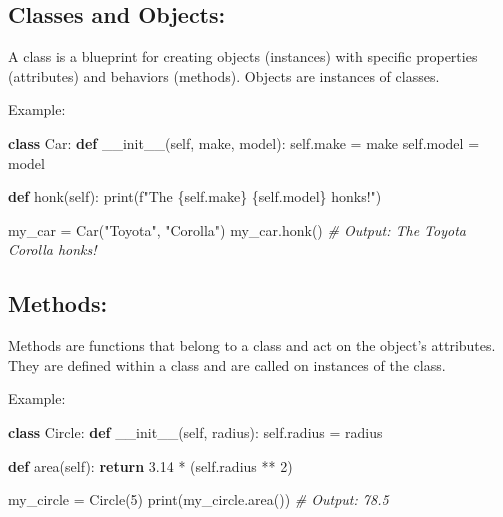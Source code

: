 \documentclass[
  paper=a4,
  ,captions=tableheading
]{scrartcl}
\newenvironment{Shaded}{}{}
\newcommand{\BuiltInTok}[1]{\textcolor[rgb]{0.00,0.50,0.00}{#1}}
\newcommand{\CommentTok}[1]{\textcolor[rgb]{0.38,0.63,0.69}{\textit{#1}}}
\newcommand{\ControlFlowTok}[1]{\textcolor[rgb]{0.00,0.44,0.13}{\textbf{#1}}}
\newcommand{\DecValTok}[1]{\textcolor[rgb]{0.25,0.63,0.44}{#1}}
\newcommand{\FloatTok}[1]{\textcolor[rgb]{0.25,0.63,0.44}{#1}}
\newcommand{\FunctionTok}[1]{\textcolor[rgb]{0.02,0.16,0.49}{#1}}
\newcommand{\KeywordTok}[1]{\textcolor[rgb]{0.00,0.44,0.13}{\textbf{#1}}}
\newcommand{\NormalTok}[1]{#1}
\newcommand{\OperatorTok}[1]{\textcolor[rgb]{0.40,0.40,0.40}{#1}}
\newcommand{\SpecialCharTok}[1]{\textcolor[rgb]{0.25,0.44,0.63}{#1}}
\newcommand{\SpecialStringTok}[1]{\textcolor[rgb]{0.73,0.40,0.53}{#1}}
\newcommand{\StringTok}[1]{\textcolor[rgb]{0.25,0.44,0.63}{#1}}
\newcommand{\VariableTok}[1]{\textcolor[rgb]{0.10,0.09,0.49}{#1}}
\begin{document}
\hypertarget{classes-and-objects-1}{%
\subsection{Classes and Objects:}\label{classes-and-objects-1}}

A class is a blueprint for creating objects (instances) with specific
properties (attributes) and behaviors (methods). Objects are instances
of classes.

Example:

\begin{Shaded}
\begin{Highlighting}[]
\KeywordTok{class}\NormalTok{ Car:}
    \KeywordTok{def} \FunctionTok{\_\_init\_\_}\NormalTok{(}\VariableTok{self}\NormalTok{, make, model):}
        \VariableTok{self}\NormalTok{.make }\OperatorTok{=}\NormalTok{ make}
        \VariableTok{self}\NormalTok{.model }\OperatorTok{=}\NormalTok{ model}

    \KeywordTok{def}\NormalTok{ honk(}\VariableTok{self}\NormalTok{):}
        \BuiltInTok{print}\NormalTok{(}\SpecialStringTok{f"The }\SpecialCharTok{\{}\VariableTok{self}\SpecialCharTok{.}\NormalTok{make}\SpecialCharTok{\}}\SpecialStringTok{ }\SpecialCharTok{\{}\VariableTok{self}\SpecialCharTok{.}\NormalTok{model}\SpecialCharTok{\}}\SpecialStringTok{ honks!"}\NormalTok{)}

\NormalTok{my\_car }\OperatorTok{=}\NormalTok{ Car(}\StringTok{"Toyota"}\NormalTok{, }\StringTok{"Corolla"}\NormalTok{)}
\NormalTok{my\_car.honk()  }\CommentTok{\# Output: The Toyota Corolla honks!}
\end{Highlighting}
\end{Shaded}

\hypertarget{methods}{%
\subsection{Methods:}\label{methods}}

Methods are functions that belong to a class and act on the object's
attributes. They are defined within a class and are called on instances
of the class.

Example:

\begin{Shaded}
\begin{Highlighting}[]

\KeywordTok{class}\NormalTok{ Circle:}
    \KeywordTok{def} \FunctionTok{\_\_init\_\_}\NormalTok{(}\VariableTok{self}\NormalTok{, radius):}
        \VariableTok{self}\NormalTok{.radius }\OperatorTok{=}\NormalTok{ radius}

    \KeywordTok{def}\NormalTok{ area(}\VariableTok{self}\NormalTok{):}
        \ControlFlowTok{return} \FloatTok{3.14} \OperatorTok{*}\NormalTok{ (}\VariableTok{self}\NormalTok{.radius }\OperatorTok{**} \DecValTok{2}\NormalTok{)}

\NormalTok{my\_circle }\OperatorTok{=}\NormalTok{ Circle(}\DecValTok{5}\NormalTok{)}
\BuiltInTok{print}\NormalTok{(my\_circle.area())  }\CommentTok{\# Output: 78.5}
\end{Highlighting}
\end{Shaded}
\end{document}
